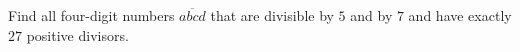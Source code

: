 Find all four-digit numbers $\overline{abcd}$ that are divisible by $5$ and by $7$ and have exactly $27$ positive divisors.
